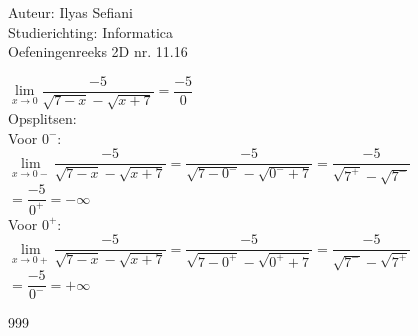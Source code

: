 \documentclass[a4paper]{article}
\begin{document}
\noindent \large Auteur: Ilyas Sefiani \\
\noindent \large Studierichting: Informatica\\
\noindent \large Oefeningenreeks 2D nr. 11.16\\

\medskip

\normalsize

$\lim\limits_{x \rightarrow 0}\dfrac{-5}{\sqrt{7-x}-\sqrt{x+7}} = \dfrac{-5}{0}$\\


Opsplitsen:\\

Voor $0^-$:\\

$\lim\limits_{x \rightarrow 0-}\dfrac{-5}{\sqrt{7-x}-\sqrt{x+7}} = \dfrac{-5}{\sqrt{7-0^-}-\sqrt{0^-+7}} = \dfrac{-5}{\sqrt{7^+}-\sqrt{7^-}}$\\

$=\dfrac{-5}{0^+} = -\infty$\\

Voor $0^+$:\\

$\lim\limits_{x \rightarrow 0+}\dfrac{-5}{\sqrt{7-x}-\sqrt{x+7}} = \dfrac{-5}{\sqrt{7-0^+}-\sqrt{0^++7}} = \dfrac{-5}{\sqrt{7^-}-\sqrt{7^+}}$\\

$=\dfrac{-5}{0^-} = +\infty$\\

\begin{thebibliography}{999}
\end{thebibliography}
\end{document}
